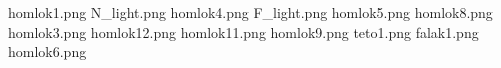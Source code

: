 homlok1.png
N_light.png
homlok4.png
F_light.png
homlok5.png
homlok8.png
homlok3.png
homlok12.png
homlok11.png
homlok9.png
teto1.png
falak1.png
homlok6.png
